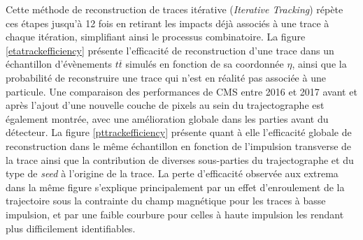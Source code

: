 Cette méthode de reconstruction de traces itérative (\textit{Iterative Tracking}) \cite{IterativeTracking} répète ces étapes jusqu'à 12 fois en retirant les impacts déjà associés à une trace à chaque itération, simplifiant ainsi le processus combinatoire. La figure \ref{etatrackefficiency} présente l'efficacité de reconstruction d'une trace dans un échantillon d'évènements $t\overline{t}$ simulés en fonction de sa coordonnée $\eta$, ainsi que la probabilité de reconstruire une trace qui n'est en réalité pas associée à une particule. Une comparaison des performances de CMS entre 2016 et 2017 avant et après l'ajout d'une nouvelle couche de pixels au sein du trajectographe est également montrée, avec une amélioration globale dans les parties avant du détecteur. La figure \ref{pttrackefficiency} présente quant à elle l'efficacité globale de reconstruction dans le même échantillon en fonction de l'impulsion transverse de la trace ainsi que la contribution de diverses sous-parties du trajectographe et du type de \textit{seed} à l'origine de la trace. La perte d'efficacité observée aux extrema dans la même figure s'explique principalement par un effet d'enroulement de la trajectoire sous la contrainte du champ magnétique pour les traces à basse impulsion, et par une faible courbure pour celles à haute impulsion les rendant plus difficilement identifiables. \\

